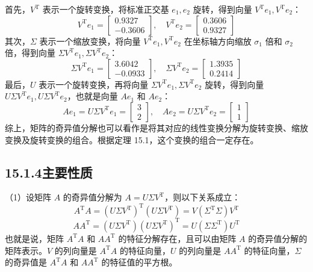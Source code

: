 \documentclass[UTF8,12pt,a4paper,fontset=fandol]{ctexart}
\begin{document}
首先，$V^{\mathrm{T}}$ 表示一个旋转变换，将标准正交基 $e_1,e_2$ 旋转，得到向量 $V^{\mathrm{T}}e_1,V^{\mathrm{T}}e_2$：
\[
V^{\mathrm{T}}e_1=\begin{bmatrix}0.9327\\-0.3606\end{bmatrix},\quad
V^{\mathrm{T}}e_2=\begin{bmatrix}0.3606\\0.9327\end{bmatrix}
\]
其次，$\Sigma$ 表示一个缩放变换，将向量 $V^{\mathrm{T}}e_1,V^{\mathrm{T}}e_2$ 在坐标轴方向缩放 $\sigma_1$ 倍和 $\sigma_2$ 倍，得到向量 $\Sigma V^{\mathrm{T}}e_1,\Sigma V^{\mathrm{T}}e_2$：
\[
\Sigma V^{\mathrm{T}}e_1=\begin{bmatrix}3.6042\\-0.0933\end{bmatrix},\quad
\Sigma V^{\mathrm{T}}e_2=\begin{bmatrix}1.3935\\0.2414\end{bmatrix}
\]
最后，$U$ 表示一个旋转变换，再将向量 $\Sigma V^{\mathrm{T}}e_1,\Sigma V^{\mathrm{T}}e_2$ 旋转，得到向量 $U\Sigma V^{\mathrm{T}}e_1,U\Sigma V^{\mathrm{T}}e_2$，也就是向量 $Ae_1$ 和 $Ae_2$：
\[
Ae_1=U\Sigma V^{\mathrm{T}}e_1=\begin{bmatrix}3\\2\end{bmatrix},\quad
Ae_2=U\Sigma V^{\mathrm{T}}e_2=\begin{bmatrix}1\\1\end{bmatrix}
\]
综上，矩阵的奇异值分解也可以看作是将其对应的线性变换分解为旋转变换、缩放变换及旋转变换的组合。根据定理 15.1，这个变换的组合一定存在。

\subsection*{15.1.4\quad 主要性质}

（1）设矩阵 $A$ 的奇异值分解为 $A=U\Sigma V^{\mathrm{T}}$，则以下关系成立：
\begin{equation}
A^{\mathrm{T}}A=(U\Sigma V^{\mathrm{T}})^{\mathrm{T}}(U\Sigma V^{\mathrm{T}})
=V(\Sigma^{\mathrm{T}}\Sigma)V^{\mathrm{T}}
\tag{15.20}
\end{equation}
\begin{equation}
AA^{\mathrm{T}}=(U\Sigma V^{\mathrm{T}})(U\Sigma V^{\mathrm{T}})^{\mathrm{T}}
=U(\Sigma\Sigma^{\mathrm{T}})U^{\mathrm{T}}
\tag{15.21}
\end{equation}
也就是说，矩阵 $A^{\mathrm{T}}A$ 和 $AA^{\mathrm{T}}$ 的特征分解存在，且可以由矩阵 $A$ 的奇异值分解的矩阵表示。$V$ 的列向量是 $A^{\mathrm{T}}A$ 的特征向量，$U$ 的列向量是 $AA^{\mathrm{T}}$ 的特征向量，$\Sigma$ 的奇异值是 $A^{\mathrm{T}}A$ 和 $AA^{\mathrm{T}}$ 的特征值的平方根。
\end{document}
